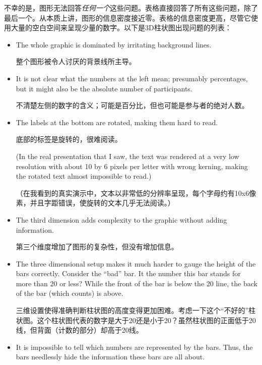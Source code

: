 不幸的是，图形无法回答\emph{任何一个}这些问题。表格直接回答了所有这些问题，除了最后一个。从本质上讲，图形的信息密度接近零。表格的信息密度更高，尽管它使用大量的空白空间来呈现少量的数字。以下是3D柱状图出现问题的列表：
%
\begin{itemize}
    \item The whole graphic is dominated by irritating background lines.

    整个图形被令人讨厌的背景线所主导。
    \item It is not clear what the numbers at the left mean; presumably
        percentages, but it might also be the absolute number of
        participants.

    不清楚左侧的数字的含义；可能是百分比，但也可能是参与者的绝对人数。
    \item The labels at the bottom are rotated, making them hard to read.

    底部的标签是旋转的，很难阅读。



        (In the real presentation that I saw, the text was rendered at a very
        low resolution with about 10 by 6 pixels per letter with wrong
        kerning, making the rotated text almost impossible to read.)

        （在我看到的真实演示中，文本以非常低的分辨率呈现，每个字母约有10x6像素，并且字距错误，使旋转的文本几乎无法阅读。）


    \item The third dimension adds complexity to the graphic without adding
        information.

        第三个维度增加了图形的复杂性，但没有增加信息。


    \item The three dimensional setup makes it much harder to gauge the
        height of the bars correctly. Consider the ``bad'' bar. It the number
        this bar stands for more than 20 or less? While the front of the bar
        is below the 20 line, the back of the bar (which counts) is above.

        三维设置使得准确判断柱状图的高度变得更加困难。考虑一下这个“不好的”柱状图。这个柱状图代表的数字是大于20还是小于20？虽然柱状图的正面低于20线，但背面（计数的部分）却高于20线。




    \item It is impossible to tell which  numbers are represented by the
        bars. Thus, the bars needlessly hide the information these bars are
        all about.


\end{itemize}
